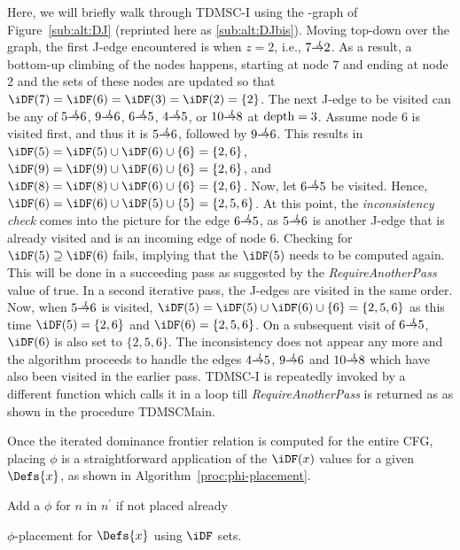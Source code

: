 {Here, we will briefly walk through TDMSC-I using the \DJ-graph of Figure~\ref{sub:alt:DJ} (reprinted here as \ref{sub:alt:DJbis}). 
Moving top-down over the graph, the first J-edge encountered is when $z=2$, i.e., $7 \st{J} 2$. 
As a result, a bottom-up climbing of the nodes happens, starting at node $7$ and ending at node $2$ and the \iDF sets of these nodes are updated so that $\iDF(7) = \iDF(6) = \iDF(3) = \iDF(2) = \{2\}$. 
The next J-edge to be visited can be any of $5 \st{J} 6$, $9 \st{J} 6$, $6 \st{J} 5$, $4 \st{J} 5$, or $10 \st{J} 8$ at $\textrm{depth} = 3$. 
Assume node 6 is visited first, and thus it is $5 \st{J} 6$, followed by $9 \st{J} 6$. 
This results in $\iDF(5) = \iDF(5) \cup \iDF(6) \cup \{6\} = \{2,6\}$, $\iDF(9) = \iDF(9) \cup \iDF(6) \cup \{6\} = \{2,6\}$, and $\iDF(8) = \iDF(8) \cup \iDF(6) \cup \{6\} = \{2,6\}$. 
Now, let $6 \st{J} 5$ be visited. 
Hence, $\iDF(6) = \iDF(6) \cup \iDF(5) \cup \{5\} = \{2,5,6\}$. 
At this point, the \emph{inconsistency check} comes into the picture for the edge $6 \st{J} 5$, as $5 \st{J} 6$ is another J-edge that is already visited and is an incoming edge of node $6$. 
Checking for $\iDF(5) \supseteq \iDF(6)$ fails, implying that the $\iDF(5)$ needs to be computed again. 
This will be done in a succeeding pass as suggested by the \textit{RequireAnotherPass} value of true. 
In a second iterative pass, the J-edges are visited in the same order. 
Now, when $5 \st{J} 6$ is visited, $\iDF(5) = \iDF(5) \cup \iDF(6) \cup \{6\} = \{2,5,6\}$ as this time $\iDF(5) = \{2,6\}$ and $\iDF(6) = \{2,5,6\}$. 
On a subsequent visit of $6 \st{J} 5$, $\iDF(6)$ is also set to $\{2,5,6\}$. 
The inconsistency does not appear any more and the algorithm proceeds to handle the edges $4 \st{J} 5$, $9 \st{J} 6$ and $10 \st{J} 8$ which have also been visited in the earlier pass. 
TDMSC-I is repeatedly invoked by a different function which calls it in a loop till \textit{RequireAnotherPass} is returned as \false as shown in the procedure TDMSCMain.

Once the iterated dominance frontier relation is computed for the entire CFG, placing $\phi$ is a straightforward application of the $\iDF(x)$ values for a given $\Defs{x}$, as shown in Algorithm~\ref{proc:phi-placement}.

\begin{algorithm}
   {
     {
      Add a $\phi$ for $n$ in $n^{'}$ if not placed already
    }
  }
  \caption{$\phi$-placement for $\Defs{x}$ using $\iDF$ sets.}
  \label{proc:phi-placement}


\end{algorithm}}
